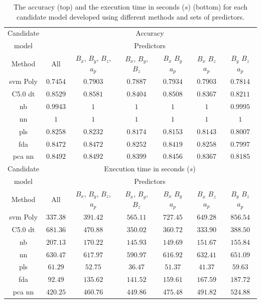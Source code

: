 \let\LaTeXcline\cline\documentclass[sn-mathphys-num]{sn-jnl}\let\cline\LaTeXcline
\begin{document}
\begin{table}[!ht]
    \centering
    \caption{The accuracy (top) and the execution time in seconds ($s$) (bottom) for each candidate model developed using different methods and sets of predictors.}
	\label{tab:acc:time}
	\begin{tabular}{|c|c|c|c|c|c|c|}
		\hline
        Candidate & \multicolumn{6}{|c|}{Accuracy} \\ \cline{2-7}
        model & \multicolumn{6}{|c|}{Predictors} \\ \hline
		Method & All & $B_{x}$, $B_{y}$, $B_{z}$, $a_{p}$ & $B_{x}$, $B_{y}$, $B_{z}$ & $B_{x}$ $B_{y}$ $a_{p}$ & $B_{x}$ $B_{z}$ $a_{p}$ & $B_{y}$ $B_{z}$ $a_{p}$ \\ \hline
		\acrshort{svm} Poly & $0.7454$ & $0.7903$ & $0.7887$ & $0.7934$ & $0.7903$ & $0.7814$ \\ \hline
		C5.0 \acrshort{dt} & $0.8529$ & $0.8581$ & $0.8404$ & $0.8508$ & $0.8367$ & $0.8211$ \\ \hline
		\acrshort{nb} & $0.9943$ & $1$ & $1$ & $1$ & $1$ & $0.9995$ \\ \hline
		\acrshort{nn} & $1$ & $1$ & $1$ & $1$ & $1$ & $1$ \\ \hline
		\acrshort{pls} & $0.8258$ & $0.8232$ & $0.8174$ & $0.8153$ & $0.8143$ & $0.8007$ \\ \hline
		\acrshort{fda} & $0.8472$ & $0.8472$ & $0.8252$ & $0.8419$ & $0.8258$ & $0.7997$ \\ \hline
		\acrshort{pca} \acrshort{nn} & $0.8492$ & $0.8492$ & $0.8399$ & $0.8456$ & $0.8367$ & $0.8185$ \\ \hline
        Candidate & \multicolumn{6}{|c|}{Execution time in seconds ($s$)} \\ \cline{2-7}
        model & \multicolumn{6}{|c|}{Predictors} \\ \hline
		Method & All & $B_{x}$, $B_{y}$, $B_{z}$, $a_{p}$ & $B_{x}$, $B_{y}$, $B_{z}$ & $B_{x}$ $B_{y}$ $a_{p}$ & $B_{x}$ $B_{z}$ $a_{p}$ & $B_{y}$ $B_{z}$ $a_{p}$ \\ \hline
		\acrshort{svm} Poly & $337.38$ & $391.42$ & $565.11$ & $727.45$ & $649.28$ & $856.54$ \\ \hline
		C5.0 \acrshort{dt} & $681.36$ & $470.88$ & $350.02$ & $360.72$ & $333.90$ & $388.50$ \\ \hline
		\acrshort{nb} & $207.13$ & $170.22$ & $145.93$ & $149.69$ & $151.67$ & $155.84$ \\ \hline
		\acrshort{nn} & $630.47$ & $617.97$ & $590.97$ & $616.92$ & $632.41$ & $651.09$ \\ \hline
		\acrshort{pls} & $61.29$ & $52.75$ & $36.47$ & $51.37$ & $41.37$ & $59.63$ \\ \hline
		\acrshort{fda} & $92.49$ & $135.62$ & $141.52$ & $159.61$ & $167.59$ & $187.72$ \\ \hline
		\acrshort{pca} \acrshort{nn} & $420.25$ & $460.76$ & $449.86$ & $475.48$ & $491.82$ & $524.88$ \\ \hline
	\end{tabular}
\end{table}
\end{document}
